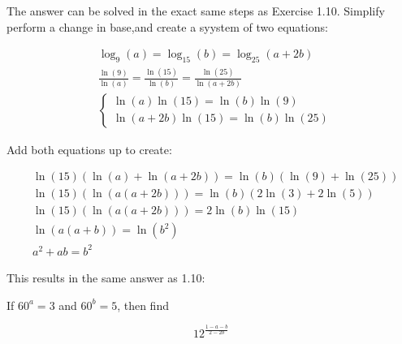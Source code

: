 \begin{solution}

The answer can be solved in the exact same steps as Exercise 1.10. Simplify perform a change in base,and create a syystem of two equations:

\begin{equation*}
  \begin{aligned}
    & \log_9(a) = \log_{15}(b) = \log_{25}(a+2b) \\
    & \frac{\ln(9)}{\ln(a)} = \frac{\ln(15)}{\ln(b)} = \frac{\ln(25)}{\ln(a+2b)} \\
    & \begin{cases}
      \ln(a)\ln(15) = \ln(b)\ln(9) \\
      \ln(a+2b)\ln(15) = \ln(b)\ln(25)
    \end{cases}
  \end{aligned}
\end{equation*}

Add both equations up to create:

\begin{equation*}
  \begin{aligned}
  & \ln(15)(\ln(a)+\ln(a+2b)) = \ln(b)(\ln(9)+\ln(25)) \\
  & \ln(15)(\ln(a(a+2b))) = \ln(b)(2\ln(3)+2\ln(5)) \\
  & \ln(15)(\ln(a(a+2b))) = 2\ln(b)\ln(15) \\
  & \ln(a(a+b)) = \ln(b^2) \\
  & a^2 + ab = b^2
  \end{aligned}
\end{equation*}

This results in the same answer as 1.10: 

\end{solution}



\begin{question}

If $60^a = 3$ and $60^b = 5$, then find

$$
  12^{\frac{1-a-b}{2-2b}}
$$

\end{question}
    
